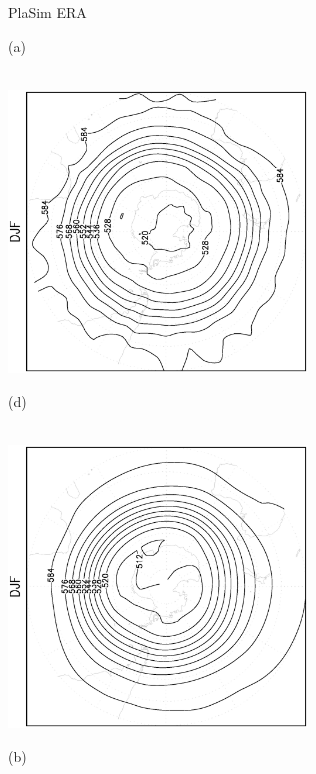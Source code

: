 \documentclass[12pt,a4paper,twoside,openright,headinclude,liststotoc,bibtotoc]{scrreprt}
\begin{document}
\begin{appendix}
\begin{figure}[b]
\hspace{3.55cm}PlaSim \vspace{0.2cm} \hspace{7.25cm} ERA \\
\parbox{8.5cm}{\hspace{0.90cm}\begin{scriptsize}(a) \end{scriptsize} \vspace{-0.5cm} \\
\includegraphics[height=7.5cm,angle=-90]
{eps/southcircysmz500DJF.eps}
}
\parbox{8.5cm}{\hspace{0.90cm}\begin{scriptsize}(d) \end{scriptsize} \vspace{-0.5cm} \\
\includegraphics[height=7.5cm,angle=-90]
{eps/southcirct21ysmz500DJF.eps}
}
\parbox{8.5cm}{\hspace{0.80cm} \begin{scriptsize}(b) \end{scriptsize} \vspace{-0.5cm} \\
}
\end{figure}
\end{appendix}
\end{document}
